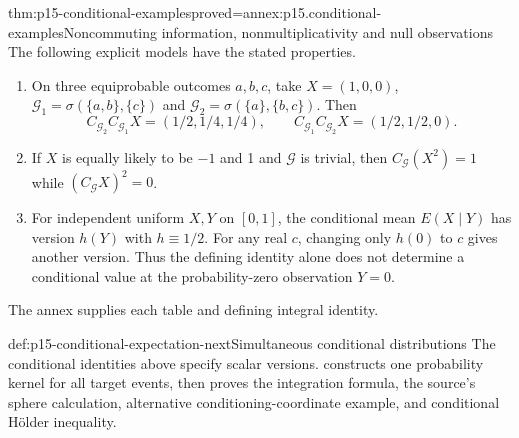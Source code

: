 \begin{hbtheorem}{thm:p15-conditional-examples}{proved=annex:p15.conditional-examples}{Noncommuting information, nonmultiplicativity and null observations}
The following explicit models have the stated properties.
\begin{enumerate}
\item On three equiprobable outcomes \(a,b,c\), take \(X=(1,0,0)\),
      \(\mathcal G_1=\sigma(\{a,b\},\{c\})\) and
      \(\mathcal G_2=\sigma(\{a\},\{b,c\})\). Then
      \[
      C_{\mathcal G_2}C_{\mathcal G_1}X=(1/2,1/4,1/4),\qquad
      C_{\mathcal G_1}C_{\mathcal G_2}X=(1/2,1/2,0).
      \]
\item If \(X\) is equally likely to be \(-1\) and 1 and \(\mathcal G\)
      is trivial, then \(C_{\mathcal G}(X^2)=1\) while
      \((C_{\mathcal G}X)^2=0\).
\item For independent uniform \(X,Y\) on \([0,1]\), the conditional
      mean \(E(X\mid Y)\) has version \(h(Y)\) with \(h\equiv1/2\).
      For any real \(c\), changing only \(h(0)\) to \(c\) gives another
      version. Thus the defining identity alone does not determine a
      conditional value at the probability-zero observation \(Y=0\).
\end{enumerate}
The annex supplies each table and defining integral identity.
\end{hbtheorem}

\begin{proofboundary}{def:p15-conditional-expectation-next}{Simultaneous conditional distributions}
The conditional identities above specify scalar versions.
 constructs one probability kernel
for all target events, then proves the integration formula, the source's
sphere calculation, alternative conditioning-coordinate example, and
conditional H\"older inequality.
\end{proofboundary}
